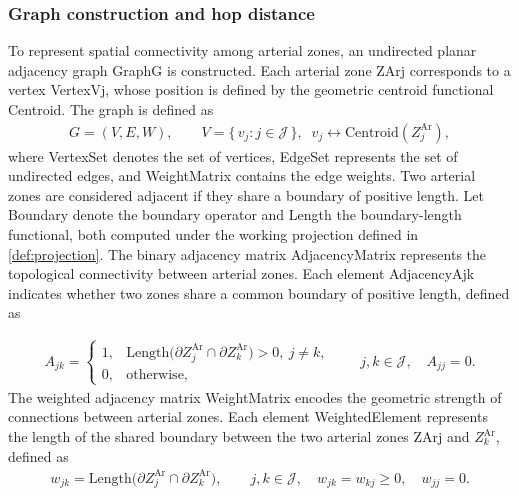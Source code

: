 \subsubsection{Graph construction and hop distance}
\label{subsec:hop_distance}
To represent spatial connectivity among arterial zones, an undirected planar adjacency graph \gls{GraphG} is constructed.
Each arterial zone \gls{ZArj} corresponds to a vertex \gls{VertexVj}, whose position is defined by the geometric centroid functional \gls{Centroid}.
The graph is defined as
\begin{align}
G=(V,E,W),\qquad 
V=\{\,v_j : j\in\mathcal{J}\,\},\;\; v_j \leftrightarrow \mathrm{Centroid}(Z^{\mathrm{Ar}}_j),\label{eq:urban_graph}
\end{align}
where \gls{VertexSet} denotes the set of vertices, \gls{EdgeSet} represents the set of undirected edges, and \gls{WeightMatrix} contains the edge weights.
Two arterial zones are considered adjacent if they share a boundary of positive length.
Let \gls{Boundary} denote the boundary operator and \gls{Length} the boundary-length functional, both computed under the working projection defined in \ref{def:projection}.
The binary adjacency matrix \gls{AdjacencyMatrix} represents the topological connectivity between arterial zones.
Each element \gls{AdjacencyAjk} indicates whether two zones share a common boundary of positive length, defined as

\begin{align}
\label{eq:adjacency_unweighted_fixed}
A_{jk}
=\begin{cases}
1, & \mathrm{Length}\!\bigl(\partial Z^{\mathrm{Ar}}_j \cap \partial Z^{\mathrm{Ar}}_k\bigr) > 0,\ j\neq k,\\[0.25em]
0, & \text{otherwise},
\end{cases}
\qquad j,k \in \mathcal{J},\quad A_{jj}=0.
\end{align}
The weighted adjacency matrix \gls{WeightMatrix} encodes the geometric strength of connections between arterial zones.
Each element \gls{WeightedElement} represents the length of the shared boundary between the two arterial zones \gls{ZArj} and $Z^{\mathrm{Ar}}_k$, defined as
\begin{align}
\label{eq:adjacency_weight_fixed}
w_{jk}
=\mathrm{Length}\!\bigl(\partial Z^{\mathrm{Ar}}_j \cap \partial Z^{\mathrm{Ar}}_k\bigr),
\qquad j,k \in \mathcal{J},\quad w_{jk}=w_{kj}\ge 0,\quad w_{jj}=0.
\end{align}

